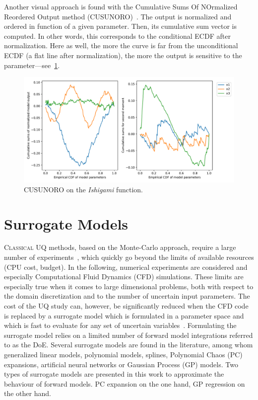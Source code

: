 Another visual approach is found with the Cumulative Sums Of NOrmalized Reordered Output method (CUSUNORO)~\cite{Plischke2012}. The output is normalized and ordered in function of a given parameter. Then, its cumulative sum vector is computed. In other words, this corresponds to the conditional ECDF after normalization. Here as well, the more the curve is far from the unconditional ECDF (a flat line after normalization), the more the output is sensitive to the parameter---see~\cref{fig:cusunoro}.

\begin{figure}[!h]
\centering
\includegraphics[width=0.8\linewidth,keepaspectratio]{fig/literature/cusunoro-ishigami.pdf}
\caption{CUSUNORO on the \emph{Ishigami} function.}
\label{fig:cusunoro}
\end{figure}


\section{Surrogate Models}\label{sec:surrogate}

\lettrine{C}{lassical} UQ methods, based on the Monte-Carlo approach, require a large number of experiments~\citep{iooss2010,iooss2016,lamboni2011,lemaitreknio2010,saltelli2007,storlie2009}, which quickly go beyond the limits of available resources (CPU cost, budget). In the following, numerical experiments are considered and especially Computational Fluid Dynamics (CFD) simulations. These limits are especially true when it comes to large dimensional problems, both with respect to the domain discretization and to the number of uncertain input parameters. The cost of the UQ study can, however, be significantly reduced when the CFD code is replaced by a surrogate model which is formulated in a parameter space and which is fast to evaluate for any set of uncertain variables~\cite{martin2005}. Formulating the surrogate model relies on a limited number of forward model integrations referred to as the DoE. Several surrogate models are found in the literature, among whom generalized linear models, polynomial models, splines, Polynomial Chaos (PC) expansions, artificial neural networks or Gaussian Process (GP) models. Two types of surrogate models are presented in this work to approximate the behaviour of forward models. PC expansion on the one hand, GP regression on the other hand. 

